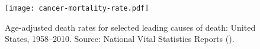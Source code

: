 






\begin{figure}[ht]
  \texttt{[image: cancer-mortality-rate.pdf]}
  \caption[Age-adjusted death rates for selected leading causes of death: United
  States, 1958–2010]{Age-adjusted death rates for selected leading causes of
    death: United States, 1958–2010.  Source:  National Vital
    Statistics Reports (\citealp{murphy_deaths:_2013}).}
  \label{fig:cancer-mortality-rate}
\end{figure}

